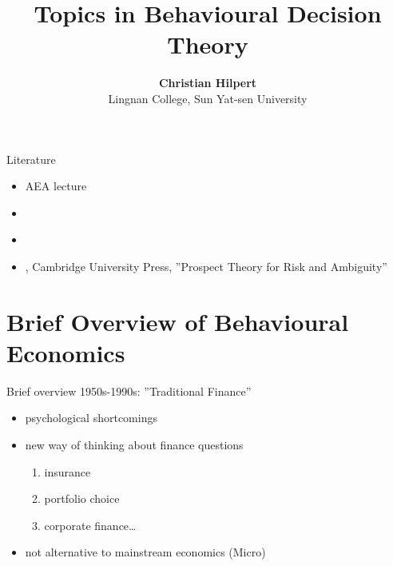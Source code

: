 \documentclass[11pt, aspectratio=169]{beamer}
\begin{document}
\title{Topics in Behavioural Decision  Theory}

\author[Christian Hilpert]
{
{\bf Christian Hilpert}\\
{\small Lingnan College, Sun Yat-sen University}\\[1ex]
}


\begin{frame}
    \titlepage
    \note{~}
\end{frame}




\begin{frame}{Literature}
    \begin{itemize}
        \item \citet{Barberis2017Talk} AEA lecture\bigskip
        \item \citet{Thaler2016}\bigskip
        \item \citet{Barberis2013a}\bigskip
        \item \citet{Wakker2010}, Cambridge University Press, ''Prospect Theory for Risk and Ambiguity''\bigskip
	\end{itemize}
\end{frame}

\section{Brief Overview of Behavioural Economics}
\begin{frame}{Brief overview}
    1950s-1990s: ''Traditional Finance''\bigskip
\begin{itemize}
	\item psychological shortcomings \bigskip
    \item new way of thinking about finance questions\bigskip
        \begin{enumerate}
            \item insurance\medskip
            \item portfolio choice\medskip
            \item corporate finance\ldots
            \medskip
        \end{enumerate}
    \item not alternative to mainstream economics (Micro)\bigskip
\end{itemize}
\end{frame}
\end{document}
